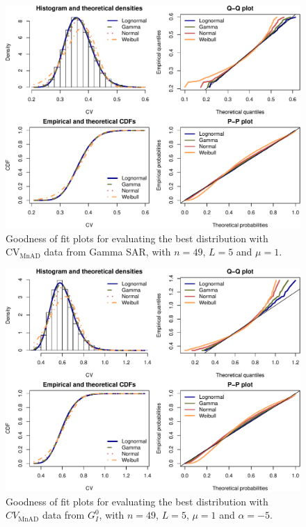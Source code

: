 \documentclass[remotesensing,article,submit,moreauthors,pdftex]{Definitions/mdpi}
\begin{document}
\begin{figure}[H]

{\centering \includegraphics[width=1\linewidth]{Identifying-Heterogeneity-in-SAR-Data-with-New-Test-Statistics_files/figure-latex/Plot_MnADmedian_gamma-1} 

}

\caption{Goodness of fit plots for evaluating the best distribution with $\text{CV}_{\text{MnAD}}$ data from Gamma SAR, with  $n=49$, $L=5$ and $\mu=1$.}\label{fig:Plot_MnADmedian_gamma}
\end{figure}

\begin{figure}[hbt]
\includegraphics[width=1\linewidth]{Identifying-Heterogeneity-in-SAR-Data-with-New-Test-Statistics_files/figure-latex/Plot_madmed_gi0_MnADmedian-1} \caption{Goodness of fit plots for evaluating the best distribution with $CV_{\text{MnAD}}$ data from $G_I^0$, with  $n=49$, $L=5$, $\mu=1$ and $\alpha=-5$.}\label{fig:Plot_madmed_gi0_MnADmedian}
\end{figure}
\end{document}

